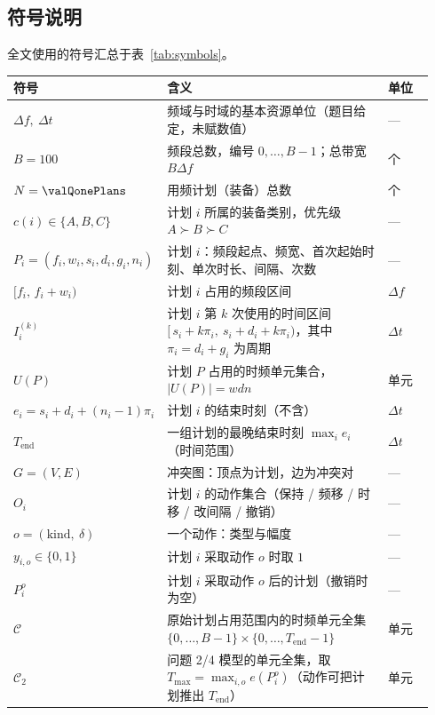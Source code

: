 \subsection{符号说明}

全文使用的符号汇总于表~\ref{tab:symbols}。

\label{tab:symbols}
\begin{longtable}{@{}p{0.20\linewidth}p{0.60\linewidth}p{0.14\linewidth}@{}}
\toprule 符号 & 含义 & 单位 \\ \midrule \endhead \bottomrule \endfoot
$\Delta f,\ \Delta t$ & 频域与时域的基本资源单位（题目给定，未赋数值） & --- \\
$B=100$ & 频段总数，编号 $0,\dots,B-1$；总带宽 $B\Delta f$ & 个 \\
$N=\valQonePlans$ & 用频计划（装备）总数 & 个 \\
$c(i)\in\{A,B,C\}$ & 计划 $i$ 所属的装备类别，优先级 $A\succ B\succ C$ & --- \\
$P_i=(f_i,w_i,s_i,d_i,g_i,n_i)$ & 计划 $i$：频段起点、频宽、首次起始时刻、单次时长、间隔、次数 & --- \\
$[f_i,\,f_i+w_i)$ & 计划 $i$ 占用的频段区间 & $\Delta f$ \\
$I_i^{(k)}$ & 计划 $i$ 第 $k$ 次使用的时间区间 $[\,s_i+k\pi_i,\ s_i+d_i+k\pi_i)$，其中 $\pi_i=d_i+g_i$ 为周期 & $\Delta t$ \\
$U(P)$ & 计划 $P$ 占用的时频单元集合，$|U(P)|=wdn$ & 单元 \\
$e_i=s_i+d_i+(n_i-1)\pi_i$ & 计划 $i$ 的结束时刻（不含） & $\Delta t$ \\
$T_{\mathrm{end}}$ & 一组计划的最晚结束时刻 $\max_i e_i$（时间范围） & $\Delta t$ \\
$G=(V,E)$ & 冲突图：顶点为计划，边为冲突对 & --- \\
$O_i$ & 计划 $i$ 的动作集合（保持 / 频移 / 时移 / 改间隔 / 撤销） & --- \\
$o=(\text{kind},\ \delta)$ & 一个动作：类型与幅度 & --- \\
$y_{i,o}\in\{0,1\}$ & 计划 $i$ 采取动作 $o$ 时取 $1$ & --- \\
$P_i^{o}$ & 计划 $i$ 采取动作 $o$ 后的计划（撤销时为空） & --- \\
$\mathcal{C}$ & 原始计划占用范围内的时频单元全集 $\{0,\dots,B-1\}\times\{0,\dots,T_{\mathrm{end}}-1\}$ & 单元 \\
$\mathcal{C}_2$ & 问题 2/4 模型的单元全集，取 $T_{\max}=\max_{i,o}e(P_i^{o})$（动作可把计划推出 $T_{\mathrm{end}}$） & 单元 \\

\end{longtable}

